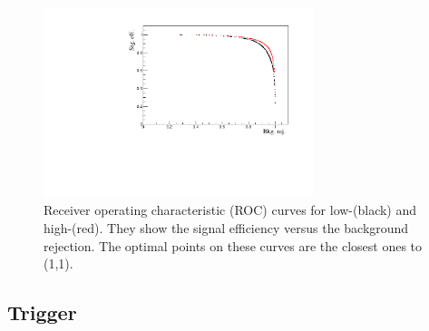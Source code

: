 \begin{figure}
\centering
\includegraphics[width=0.7\textwidth]{Lmumu/figs/ROC.pdf}
\caption{Receiver operating characteristic (ROC) curves for low-\qsq (black) and high-\qsq (red).
They show the signal efficiency versus the background rejection.
The optimal points on these curves are the closest ones to (1,1). }
\label{fig:Lb_ROC}
\end{figure}

%
%




\subsection{Trigger}

